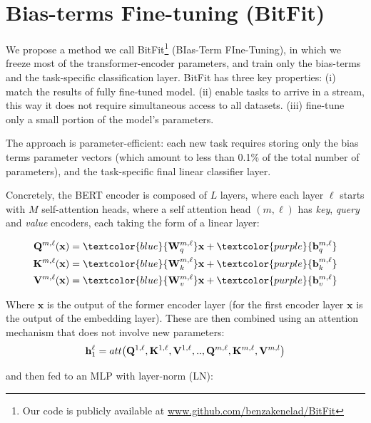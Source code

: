 \section{Bias-terms Fine-tuning (BitFit)}
\label{sec:method}

We propose a method we call BitFit\footnote{Our code is publicly available at \url{www.github.com/benzakenelad/BitFit}} (BIas-Term FIne-Tuning), in which we freeze most of the transformer-encoder parameters, and train only the bias-terms and the task-specific classification layer. BitFit has three key properties: (i) match the results of fully fine-tuned model. (ii) enable tasks to arrive in a stream, this way it does not require simultaneous access to all datasets. (iii) fine-tune only a small portion of the model's parameters.\par

The approach is parameter-efficient: each new task requires storing only the bias terms parameter vectors (which amount to less than 0.1\% of the total number of parameters), and the task-specific final linear classifier layer. 

Concretely, the BERT encoder is composed of $L$ layers, where each layer $\ell$ starts with $M$ self-attention heads, where a self attention head $(m,\ell)$ has \emph{key}, \emph{query} and \emph{value} encoders, each taking the form of a linear layer:

\begin{align*}
\mathbf{Q}^{m,\ell}(\mathbf{x}) &=
 \textcolor{blue}{\mathbf{W}_{q}^{m,\ell}}\mathbf{x} + \textcolor{purple}{\mathbf{b}_{q}^{m,\ell}} \\
\mathbf{K}^{m,\ell}(\mathbf{x}) &= \textcolor{blue}{\mathbf{W}_{k}^{m,\ell}}\mathbf{x} + \textcolor{purple}{\mathbf{b}_{k}^{m,\ell}} \\
\mathbf{V}^{m,\ell}(\mathbf{x}) &= \textcolor{blue}{\mathbf{W}_{v}^{m,\ell}}\mathbf{x} + \textcolor{purple}{\mathbf{b}_{v}^{m,\ell}}
\end{align*}

Where $\mathbf{x}$ is the output of the former encoder layer (for the first encoder layer $\mathbf{x}$ is the output of the embedding layer). These are then combined using an attention mechanism that does not involve new parameters:
\[ \mathbf{h}_1^{\ell} = att \big{(}\mathbf{Q}^{1,\ell},\mathbf{K}^{1,\ell},\mathbf{V}^{1,\ell},..,\mathbf{Q}^{m,\ell},\mathbf{K}^{m,\ell},\mathbf{V}^{m,l}\big{)} \]

 and then fed to an MLP with layer-norm (LN):

